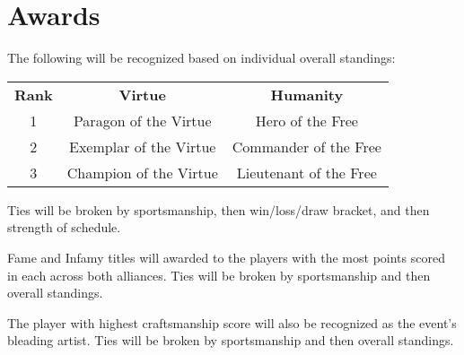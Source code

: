 \section{Awards}

The following will be recognized based on individual overall standings:

\begin{center}
\begin{tabular}{ccc}
\rowcolor{LineColor}\textbf{\color{white} Rank} & \textbf{\color{white} Virtue} & \textbf{\color{white} Humanity}\\
1 & Paragon of the Virtue & Hero of the Free\\
2 & Exemplar of the Virtue & Commander of the Free\\
3 & Champion of the Virtue & Lieutenant of the Free\\
\end{tabular}
\end{center}

Ties will be broken by sportsmanship, then
win/loss/draw bracket, and then strength of schedule.

\bigskip%
Fame and Infamy titles will awarded to the players with the most
points scored in each across both alliances.  Ties will be broken by
sportsmanship and then overall standings.

\bigskip%
The player with highest craftsmanship score will also be recognized as
the event's bleading artist.  Ties will be broken by sportsmanship and
then overall standings.
